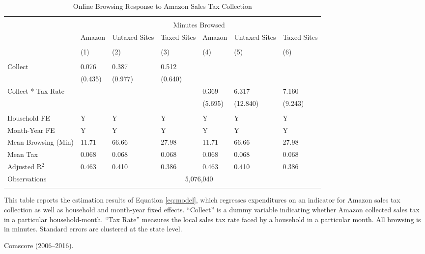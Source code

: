 
\begin{table}[!htbp] \centering
  \caption{Online Browsing Response to Amazon Sales Tax Collection}
  \label{tab:browsingDiD}
\begin{tabularx}{\textwidth}{lXXXXXX}
\\[-1.8ex]\hline
\hline \\[-1.8ex]
 & \multicolumn{6}{c}{Minutes Browsed} \\
\cline{2-7}
 & Amazon & Untaxed Sites & Taxed Sites & Amazon & Untaxed Sites & Taxed Sites \\
\\[-1.8ex] & (1) & (2) & (3) & (4) & (5) & (6)\\
\hline \\[-1.8ex]
 Collect & 0.076 & 0.387 & 0.512 &  &  &  \\
  & (0.435) & (0.977) & (0.640) &  &  &  \\
  Collect * Tax Rate &  &  &  & 0.369 & 6.317 & 7.160 \\
  &  &  &  & (5.695) & (12.840) & (9.243) \\
 \hline \\[-1.8ex]
Household FE & Y & Y & Y & Y & Y & Y \\
Month-Year FE & Y & Y & Y & Y & Y & Y \\
Mean Browsing (Min) & 11.71 & 66.66 & 27.98 & 11.71 & 66.66 & 27.98 \\
Mean Tax & 0.068 & 0.068 & 0.068 & 0.068 & 0.068 & 0.068 \\
Adjusted R$^{2}$ & 0.463 & 0.410 & 0.386 & 0.463 & 0.410 & 0.386 \\
Observations & \multicolumn{6}{c}{5,076,040} \\
\hline
\hline \\[-1.8ex]
\end{tabularx}
\begin{tablenotes}
This table reports the estimation results of Equation \ref{eq:model}, which regresses expenditures on an indicator for Amazon sales tax collection as well as household and month-year fixed effects. ``Collect'' is a dummy variable indicating whether Amazon collected sales tax in a particular household-month. ``Tax Rate'' measures the local sales tax rate faced by a household in a particular month. All browsing is in minutes. Standard errors are clustered at the state level.
\end{tablenotes}
\begin{tablenotes}[Source]
Comscore (2006--2016).
\end{tablenotes}
\end{table}
